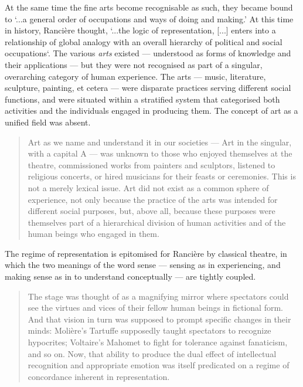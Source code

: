 \documentclass[letterpaper]{article}
\begin{document}
    At the same time the fine arts become recognisable as such, they became bound to ‘...a general order of occupations and ways of doing and making.’ At this time in history, Rancière thought, ‘...the logic of representation, [...] enters into a relationship of global analogy with an overall hierarchy of political and social occupations‘. The various \emph{arts} existed — understood as forms of knowledge and their applications — but they were not recognised as part of a singular, overarching category of human experience. The arts — music, literature, sculpture, painting, et cetera — were disparate practices serving different social functions, and were situated within a stratified system that categorised both activities and the individuals engaged in producing them. The concept of art as a unified field was absent.
    
    \begin{quote}
        Art as we name and understand it in our societies — Art in the singular, with a capital A — was unknown to those who enjoyed themselves at the theatre, commissioned works from painters and sculptors, listened to religious concerts, or hired musicians for their feasts or ceremonies. This is not a merely lexical issue. Art did not exist as a common sphere of experience, not only because the practice of the arts was intended for different social purposes, but, above all, because these purposes were themselves part of a hierarchical division of human activities and of the human beings who engaged in them. \citep[p.25]{RanciereMdrnTms2022}
    \end{quote}

    The regime of representation is epitomised for Rancière by classical theatre, in which the two meanings of the word sense — sensing as in experiencing, and making sense as in to understand conceptually — are tightly coupled.

    \begin{quote}
        The stage was thought of as a magnifying mirror where spectators could see the virtues and vices of their fellow human beings in fictional form. And that vision in turn was supposed to prompt specific changes in their minds: Molière’s Tartuffe supposedly taught spectators to recognize hypocrites; Voltaire’s Mahomet to fight for tolerance against fanaticism, and so on. Now, that ability to produce the dual effect of intellectual recognition and appropriate emotion was itself predicated on a regime of concordance inherent in representation.
    \end{quote}
\end{document}
